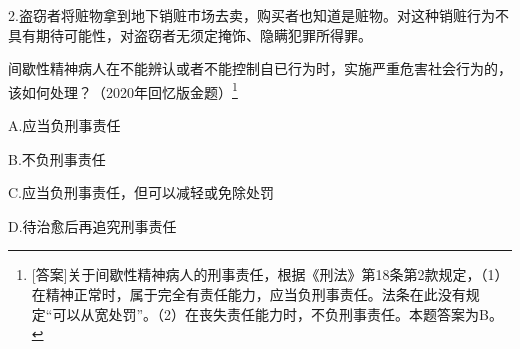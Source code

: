 2.盗窃者将赃物拿到地下销赃市场去卖，购买者也知道是赃物。对这种销赃行为不具有期待可能性，对盗窃者无须定掩饰、隐瞒犯罪所得罪。


间歇性精神病人在不能辨认或者不能控制自已行为时，实施严重危害社会行为的，该如何处理？（2020年回忆版金题）\footnote{[答案]关于间歇性精神病人的刑事责任，根据《刑法》第18条第2款规定，（1）在精神正常时，属于完全有责任能力，应当负刑事责任。法条在此没有规定“可以从宽处罚”。（2）在丧失责任能力时，不负刑事责任。本题答案为B。}

A.应当负刑事责任

B.不负刑事责任

C.应当负刑事责任，但可以减轻或免除处罚

D.待治愈后再追究刑事责任

